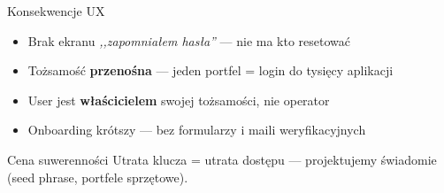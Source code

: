 \begin{frame}{Konsekwencje UX}
  \begin{itemize}
    \item Brak ekranu \textit{,,zapomniałem hasła''} --- nie ma kto resetować
    \item Tożsamość \textbf{przenośna} --- jeden portfel = login do tysięcy aplikacji
    \item User jest \textbf{właścicielem} swojej tożsamości, nie operator
    \item Onboarding krótszy --- bez formularzy i maili weryfikacyjnych
  \end{itemize}
  \vspace{0.3cm}
  \begin{alertblock}{Cena suwerenności}
    Utrata klucza = utrata dostępu --- projektujemy świadomie
    (seed phrase, portfele sprzętowe).
  \end{alertblock}
\end{frame}

